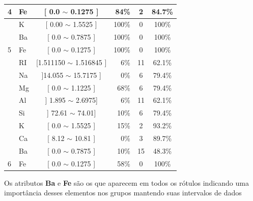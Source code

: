 \begin{table}[!h]
{\begin{tabular}{llcrcc}
\multirow{-5}{*}{4}                          & Fe    & [ 0.0 $\sim$  0.1275 ]    & 84\%  & 2  & 84.7\% \\  \hline                                            
                                            & K     & [ 0.00 $\sim$ 1.5525 ]     & 100\%  & 0 & 100\% \\ 
                                            & Ba     & [ 0.0 $\sim$  0.7875 ]    & 100\%  & 0 & 100\% \\  
\multirow{-3}{*}{5}                         & Fe    & [ 0.0 $\sim$  0.1275 ]     & 100\%  & 0 & 100\% \\  \hline
                                            & RI     & [1.511150 $\sim$  1.516845 ] & 6\%  & 11  & 62.1\% \\ 
                                            & Na     & ]14.055 $\sim$  15.7175 ] & 0\%  & 6  & 79.4\% \\ 
                                             & Mg    & [ 0.0 $\sim$  1.1225 ]    & 68\%  &6  & 79.4\%\\ 
                                             & Al    & ] 1.895 $\sim$  2.6975]      & 6\%  & 11  & 62.1\%\\
                                            & Si    & ] 72.61 $\sim$  74.01]      & 10\%  & 6  & 79.4\%\\
                                            & K     & [  0.0 $\sim$  1.5525 ]    & 15\%  & 2  & 93.2\% \\ 
                                            & Ca     & [ 8.12 $\sim$ 10.81 ]    & 0\%  & 3  & 89.7\% \\ 
                                            & Ba     & [ 0.0 $\sim$  0.7875 ]    & 10\%  & 15  & 48.3\% \\  
\multirow{-3}{*}{6}                         & Fe    & [ 0.0 $\sim$  0.1275 ]     & 58\%  & 0  & 100\% \\  \hline

\end{tabular}
}
\end{table}

Os atributos \textbf{Ba} e \textbf{Fe} são os que aparecem em todos os rótulos indicando uma importância desses elementos nos grupos mantendo suas intervalos de dados



